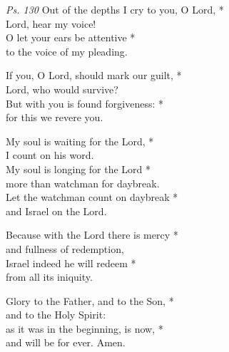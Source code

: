     \emph{Ps. 130}
%
Out of the depths I cry to you, O Lord, *\\
Lord, hear my voice!\\
O let your ears be attentive *\\
to the voice of my pleading.

If you, O Lord, should mark our guilt, *\\
Lord, who would survive?\\
But with you is found forgiveness: *\\
for this we revere you.

My soul is waiting for the Lord, *\\
I count on his word.\\
My soul is longing for the Lord *\\
more than watchman for daybreak.\\
Let the watchman count on daybreak *\\
and Israel on the Lord.

Because with the Lord there is mercy *\\
and fullness of redemption,\\
Israel indeed he will redeem *\\
from all its iniquity.

Glory to the Father, and to the Son, *\\
and to the Holy Spirit:\\
as it was in the beginning, is now, *\\
and will be for ever. Amen.